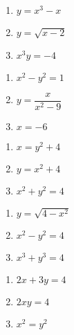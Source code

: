 \begin{multicols}{3}
\begin{enumerate}
\setcounter{enumi}{\value{HW}}

\item $y = x^{3} - x$ \label{equfunctionfirst}
\item $y = \sqrt{x - 2}$
\item $x^{3}y = -4$ 
\setcounter{HW}{\value{enumi}}
\end{enumerate}
\end{multicols}

\begin{multicols}{3}
\begin{enumerate}
\setcounter{enumi}{\value{HW}}

\item $x^{2} - y^{2} = 1$
\item $y = \dfrac{x}{x^{2} - 9}$
\item $x = -6$

\setcounter{HW}{\value{enumi}}
\end{enumerate}
\end{multicols}

\begin{multicols}{3}
\begin{enumerate}
\setcounter{enumi}{\value{HW}}

\item  $x = y^2 + 4$

\item $y = x^2 + 4$
\item $x^2 + y^2 = 4$

\setcounter{HW}{\value{enumi}}
\end{enumerate}
\end{multicols}

\begin{multicols}{3}
\begin{enumerate}
\setcounter{enumi}{\value{HW}}


\item $y = \sqrt{4-x^2}$
\item $x^2 - y^2 = 4$
\item $x^3 + y^3 = 4$


\setcounter{HW}{\value{enumi}}
\end{enumerate}
\end{multicols}

\begin{multicols}{3}
\begin{enumerate}
\setcounter{enumi}{\value{HW}}

\item $2x + 3y = 4$
\item $2xy = 4$
\item $x^2 = y^2$ \label{equfunctionlast}

\setcounter{HW}{\value{enumi}}
\end{enumerate}
\end{multicols}





